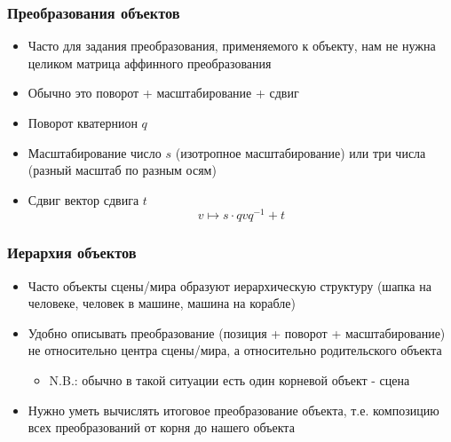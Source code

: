 \documentclass{beamer}
\begin{document}
\begin{frame}[fragile]
\frametitle{Преобразования объектов}
\begin{itemize}
\item Часто для задания преобразования, применяемого к объекту, нам не нужна целиком матрица аффинного преобразования
\item Обычно это поворот + масштабирование + сдвиг
\pause
\item Поворот \textendash{} кватернион \begin{math}q\end{math}
\item Масштабирование \textendash{} число \begin{math}s\end{math} (изотропное масштабирование) или три числа (разный масштаб по разным осям)
\item Сдвиг \textendash{} вектор сдвига \begin{math}t\end{math}
\pause
\begin{equation}
v \mapsto s \cdot qvq^{-1} + t
\end{equation}
\end{itemize}
\end{frame}

\begin{frame}[fragile]
\frametitle{Иерархия объектов}
\begin{itemize}
\item Часто объекты сцены/мира образуют иерархическую структуру (шапка на человеке, человек в машине, машина на корабле)
\item Удобно описывать преобразование (позиция + поворот + масштабирование) не относительно центра сцены/мира, а относительно родительского объекта
\begin{itemize}
\item N.B.: обычно в такой ситуации есть один корневой объект - сцена
\end{itemize}
\pause
\item Нужно уметь вычислять итоговое преобразование объекта, т.е. композицию всех преобразований от корня до нашего объекта
\end{itemize}
\end{frame}
\end{document}
